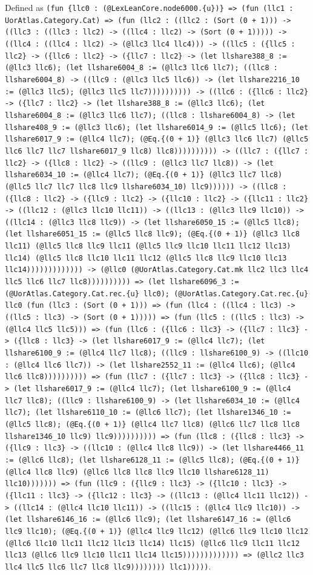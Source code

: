 \documentclass[11pt]{article}
\begin{document}
\noindent Defined as \texttt{(fun \{llc0 : (@LexLeanCore.node6000.\{u\})\} => (fun (llc1 : UorAtlas.Category.Cat) => (fun (llc2 : ((llc2 : (Sort (0 + 1))) -> ((llc3 : ((llc3 : llc2) -> ((llc4 : llc2) -> (Sort (0 + 1))))) -> ((llc4 : ((llc4 : llc2) -> (@llc3 llc4 llc4))) -> ((llc5 : (\{llc5 : llc2\} -> (\{llc6 : llc2\} -> (\{llc7 : llc2\} -> (let llshare388\_8 := (@llc3 llc6); (let llshare6004\_8 := (@llc3 llc6 llc7); ((llc8 : llshare6004\_8) -> ((llc9 : (@llc3 llc5 llc6)) -> (let llshare2216\_10 := (@llc3 llc5); (@llc3 llc5 llc7)))))))))) -> ((llc6 : (\{llc6 : llc2\} -> (\{llc7 : llc2\} -> (let llshare388\_8 := (@llc3 llc6); (let llshare6004\_8 := (@llc3 llc6 llc7); ((llc8 : llshare6004\_8) -> (let llshare408\_9 := (@llc3 llc6); (let llshare6014\_9 := (@llc5 llc6); (let llshare6017\_9 := (@llc4 llc7); (@Eq.\{(0 + 1)\} (@llc3 llc6 llc7) (@llc5 llc6 llc7 llc7 llshare6017\_9 llc8) llc8)))))))))) -> ((llc7 : (\{llc7 : llc2\} -> (\{llc8 : llc2\} -> ((llc9 : (@llc3 llc7 llc8)) -> (let llshare6034\_10 := (@llc4 llc7); (@Eq.\{(0 + 1)\} (@llc3 llc7 llc8) (@llc5 llc7 llc7 llc8 llc9 llshare6034\_10) llc9)))))) -> ((llc8 : (\{llc8 : llc2\} -> (\{llc9 : llc2\} -> (\{llc10 : llc2\} -> (\{llc11 : llc2\} -> ((llc12 : (@llc3 llc10 llc11)) -> ((llc13 : (@llc3 llc9 llc10)) -> ((llc14 : (@llc3 llc8 llc9)) -> (let llshare6050\_15 := (@llc5 llc8); (let llshare6051\_15 := (@llc5 llc8 llc9); (@Eq.\{(0 + 1)\} (@llc3 llc8 llc11) (@llc5 llc8 llc9 llc11 (@llc5 llc9 llc10 llc11 llc12 llc13) llc14) (@llc5 llc8 llc10 llc11 llc12 (@llc5 llc8 llc9 llc10 llc13 llc14))))))))))))) -> (@llc0 (@UorAtlas.Category.Cat.mk llc2 llc3 llc4 llc5 llc6 llc7 llc8)))))))))) => (let llshare6096\_3 := (@UorAtlas.Category.Cat.rec.\{u\} llc0); (@UorAtlas.Category.Cat.rec.\{u\} llc0 (fun (llc3 : (Sort (0 + 1))) => (fun (llc4 : ((llc4 : llc3) -> ((llc5 : llc3) -> (Sort (0 + 1))))) => (fun (llc5 : ((llc5 : llc3) -> (@llc4 llc5 llc5))) => (fun (llc6 : (\{llc6 : llc3\} -> (\{llc7 : llc3\} -> (\{llc8 : llc3\} -> (let llshare6017\_9 := (@llc4 llc7); (let llshare6100\_9 := (@llc4 llc7 llc8); ((llc9 : llshare6100\_9) -> ((llc10 : (@llc4 llc6 llc7)) -> (let llshare2552\_11 := (@llc4 llc6); (@llc4 llc6 llc8)))))))))) => (fun (llc7 : (\{llc7 : llc3\} -> (\{llc8 : llc3\} -> (let llshare6017\_9 := (@llc4 llc7); (let llshare6100\_9 := (@llc4 llc7 llc8); ((llc9 : llshare6100\_9) -> (let llshare6034\_10 := (@llc4 llc7); (let llshare6110\_10 := (@llc6 llc7); (let llshare1346\_10 := (@llc5 llc8); (@Eq.\{(0 + 1)\} (@llc4 llc7 llc8) (@llc6 llc7 llc8 llc8 llshare1346\_10 llc9) llc9)))))))))) => (fun (llc8 : (\{llc8 : llc3\} -> (\{llc9 : llc3\} -> ((llc10 : (@llc4 llc8 llc9)) -> (let llshare4466\_11 := (@llc6 llc8); (let llshare6128\_11 := (@llc5 llc8); (@Eq.\{(0 + 1)\} (@llc4 llc8 llc9) (@llc6 llc8 llc8 llc9 llc10 llshare6128\_11) llc10))))))) => (fun (llc9 : (\{llc9 : llc3\} -> (\{llc10 : llc3\} -> (\{llc11 : llc3\} -> (\{llc12 : llc3\} -> ((llc13 : (@llc4 llc11 llc12)) -> ((llc14 : (@llc4 llc10 llc11)) -> ((llc15 : (@llc4 llc9 llc10)) -> (let llshare6146\_16 := (@llc6 llc9); (let llshare6147\_16 := (@llc6 llc9 llc10); (@Eq.\{(0 + 1)\} (@llc4 llc9 llc12) (@llc6 llc9 llc10 llc12 (@llc6 llc10 llc11 llc12 llc13 llc14) llc15) (@llc6 llc9 llc11 llc12 llc13 (@llc6 llc9 llc10 llc11 llc14 llc15))))))))))))) => (@llc2 llc3 llc4 llc5 llc6 llc7 llc8 llc9)))))))) llc1)))))}.\par
\end{document}
